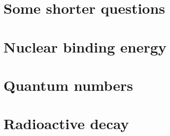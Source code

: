 \documentclass[]{article}
\begin{document}
\section{Some shorter questions}


\section{Nuclear binding energy}


\section{}

\section{}

\section{Quantum numbers}


\section{}

\section{Radioactive decay}

\end{document}
